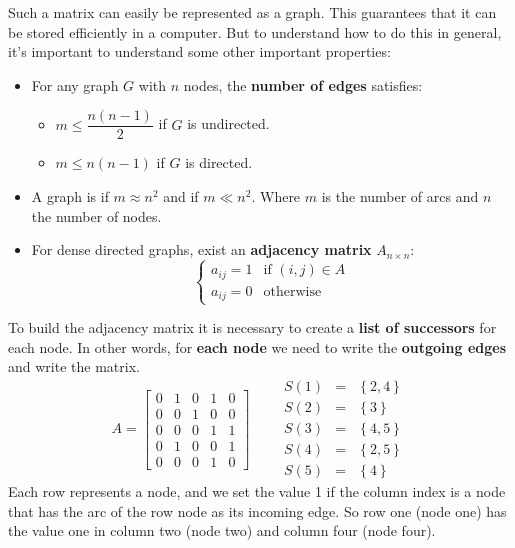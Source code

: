 Such a matrix can easily be represented as a graph. This guarantees that it can be stored efficiently in a computer. But to understand how to do this in general, it's important to understand some other important properties:
\begin{itemize}
    \item For any graph $G$ with $n$ nodes, the \textbf{number of edges} satisfies:
    \begin{itemize}
        \item $m \le \dfrac{n\left(n-1\right)}{2}$ if $G$ is undirected.
        \item $m \le n\left(n-1\right)$ if $G$ is directed.
    \end{itemize}

    \item A graph is  if $m \approx n^{2}$ and  if $m \ll n^{2}$. Where $m$ is the number of arcs and $n$ the number of nodes.

    \item For dense directed graphs, exist an \textbf{adjacency matrix} $A_{n \times n}$:
    \begin{equation*}
        \begin{cases}
            a_{ij} = 1 & \text{if } \left(i,j\right) \in A \\
            a_{ij} = 0 & \text{otherwise}
        \end{cases}
    \end{equation*}
\end{itemize}
To build the adjacency matrix it is necessary to create a \textbf{list of successors} for each node. In other words, for \textbf{each node} we need to write the \textbf{outgoing edges} and write the matrix.
\begin{equation*}
    A = \begin{bmatrix}
        0 & 1 & 0 & 1 & 0 \\
        0 & 0 & 1 & 0 & 0 \\
        0 & 0 & 0 & 1 & 1 \\
        0 & 1 & 0 & 0 & 1 \\
        0 & 0 & 0 & 1 & 0
    \end{bmatrix}
    \hspace{2em}
    \begin{array}{rcl}
        S\left(1\right) &=& \left\{2,4\right\} \\
        S\left(2\right) &=& \left\{3\right\} \\
        S\left(3\right) &=& \left\{4,5\right\} \\
        S\left(4\right) &=& \left\{2,5\right\} \\
        S\left(5\right) &=& \left\{4\right\}
    \end{array}
\end{equation*}
Each row represents a node, and we set the value 1 if the column index is a node that has the arc of the row node as its incoming edge. So row one (node one) has the value one in column two (node two) and column four (node four).

